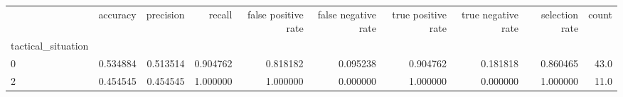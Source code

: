 \begin{tabular}{lrrrrrrrrr}
\toprule
{} &  accuracy &  precision &    recall &  false positive rate &  false negative rate &  true positive rate &  true negative rate &  selection rate &  count \\
tactical\_situation &           &            &           &                      &                      &                     &                     &                 &        \\
\midrule
0                  &  0.534884 &   0.513514 &  0.904762 &             0.818182 &             0.095238 &            0.904762 &            0.181818 &        0.860465 &   43.0 \\
2                  &  0.454545 &   0.454545 &  1.000000 &             1.000000 &             0.000000 &            1.000000 &            0.000000 &        1.000000 &   11.0 \\
\bottomrule
\end{tabular}
